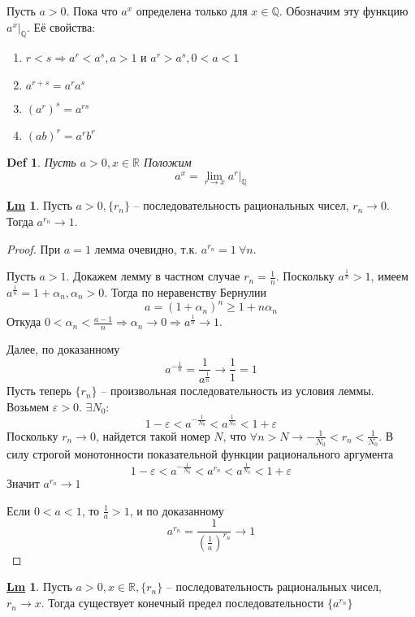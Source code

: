 \documentclass[12pt]{article}
\newenvironment{MyList}[1][4pt]{
  \begin{enumerate}[1.]
  \setlength{\parskip}{0pt}
  \setlength{\itemsep}{#1}
}{       
  \end{enumerate}
}
\def\R{\mathbb{R}}       %
\def\SO{\Rightarrow}     %
\theoremstyle{definition} %
\newtheorem{Lm}[Thm]{\underline{Lm}} %
\theoremstyle{plain} %
\newtheorem{Def}[Thm]{Def} %
\theoremstyle{remark} %
\begin{document}
Пусть $a > 0$. Пока что $a^x$ определена только для $x \in \mathbb{Q}$. Обозначим эту функцию $a^x |_\mathbb{Q}$. Её свойства:
\begin{MyList}
    \item $r < s \SO a^r < a^s, a > 1$ и $a^r > a^s, 0 < a < 1$
    \item $a^{r + s} = a^r a^s$
    \item $(a^r)^s = a^{rs}$
    \item $(ab)^r = a^r b^r$   
\end{MyList}  

\begin{Def}
    Пусть $a > 0, x \in \R$ Положим
    \[a^x = \lim_{r \to x} a^r |_\mathbb{Q}\] 
\end{Def}

\begin{Lm}
    Пусть $a > 0, \{r_n\}$ -- последовательность рациональных чисел, $r_n \to 0$. Тогда $a^{r_n} \to 1$.   
\end{Lm}

\begin{proof}
    При $a = 1$ лемма очевидно, т.к. $a^{r_n} = 1 \ \forall n$.
    
    Пусть $a > 1$. Докажем лемму в частном случае $r_n = \frac{1}{n}$. Поскольку $a^{\frac{1}{n}} > 1$, имеем $a^{\frac{1}{n}} = 1 + \alpha_n, \alpha_n > 0$. Тогда по неравенству Бернулии
    \[a = (1 + \alpha_n)^n \geqslant 1 + n \alpha_n\]
    Откуда $0 < \alpha_n < \frac{a - 1}{n} \SO \alpha_n \to 0 \SO a^{\frac{1}{n}} \to 1$.

    Далее, по доказанному 
    \[a^{-\frac{1}{n}} = \frac{1}{a^{\frac{1}{n}}} \to \frac{1}{1} = 1\]
    Пусть теперь $\{r_n\}$ -- произвольная последовательность из условия леммы. Возьмем $\varepsilon > 0$. $\exists N_0:$
    \[1 - \varepsilon < a^{-\frac{1}{N_0}} < a^{\frac{1}{N_0}} < 1 + \varepsilon\]
    Поскольку $r_n \to 0$, найдется такой номер $N$, что $\forall n > N \to -\frac{1}{N_0} < r_n < \frac{1}{N_0}$. В силу строгой монотонности показательной функции рационального аргумента
    \[1 - \varepsilon < a^{-\frac{1}{N_0}} < a^{r_n} < a^{\frac{1}{N_0}} < 1 + \varepsilon\]
    Значит $a^{r_n} \to 1$
    
    Если $0 < a < 1$, то $\frac{1}{a} > 1$, и по доказанному
    \[a^{r_n} = \frac{1}{\left(\frac{1}{a}\right)^{r_n}} \to 1\]  
\end{proof}

\begin{Lm}
    Пусть $a > 0, x \in \R, \{r_n\}$ -- последовательность рациональных чисел, $r_n \to x$. Тогда существует конечный предел последовательности $\{a^{r_n}\}$
\end{Lm}
\end{document}
